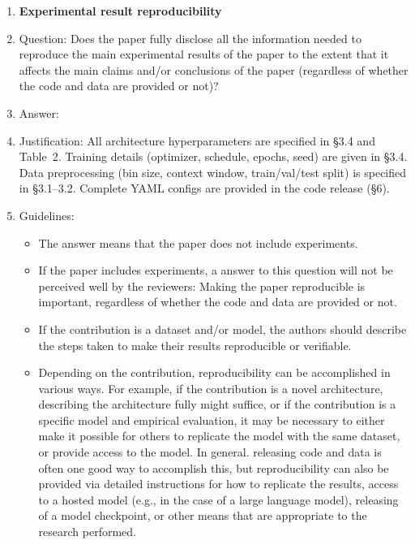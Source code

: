 \begin{enumerate}
    \item {\bf Experimental result reproducibility}
    \item[] Question: Does the paper fully disclose all the information needed to reproduce the main experimental results of the paper to the extent that it affects the main claims and/or conclusions of the paper (regardless of whether the code and data are provided or not)?
    \item[] Answer: \answerYes{}
    \item[] Justification: All architecture hyperparameters are specified
      in \S3.4 and Table~2.  Training details (optimizer, schedule,
      epochs, seed) are given in \S3.4.  Data preprocessing
      (bin size, context window, train/val/test split) is specified
      in \S3.1--3.2.  Complete YAML configs are provided in the
      code release (\S6).
    \item[] Guidelines:
    \begin{itemize}
        \item The answer \answerNA{} means that the paper does not include experiments.
        \item If the paper includes experiments, a \answerNo{} answer to this question will not be perceived well by the reviewers: Making the paper reproducible is important, regardless of whether the code and data are provided or not.
        \item If the contribution is a dataset and\slash or model, the authors should describe the steps taken to make their results reproducible or verifiable. 
        \item Depending on the contribution, reproducibility can be accomplished in various ways. For example, if the contribution is a novel architecture, describing the architecture fully might suffice, or if the contribution is a specific model and empirical evaluation, it may be necessary to either make it possible for others to replicate the model with the same dataset, or provide access to the model. In general. releasing code and data is often one good way to accomplish this, but reproducibility can also be provided via detailed instructions for how to replicate the results, access to a hosted model (e.g., in the case of a large language model), releasing of a model checkpoint, or other means that are appropriate to the research performed.

\end{itemize}
\end{enumerate}
